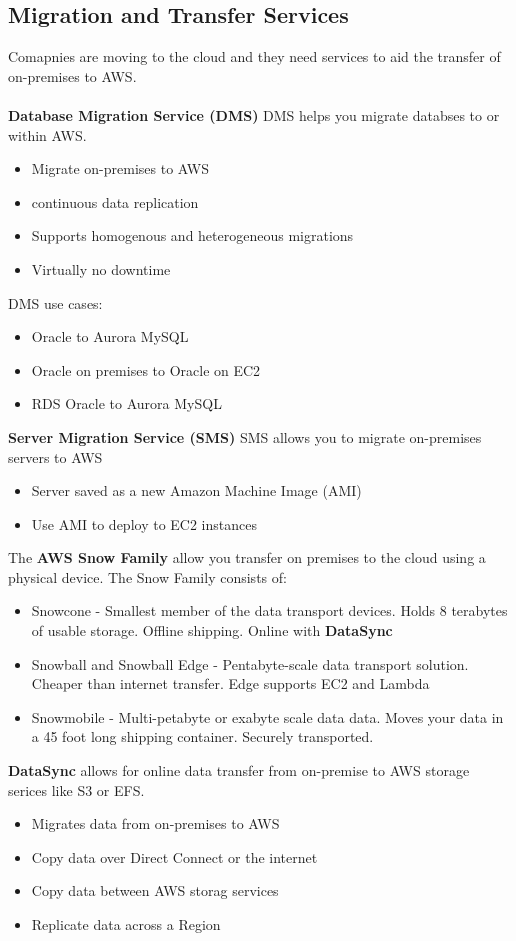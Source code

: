 \documentclass{article}%
\begin{document}
\subsection{Migration and Transfer Services}
Comapnies are moving to the cloud and they need services to aid the transfer of on-premises to AWS. \\ \\
\textbf{Database Migration Service (DMS)} DMS helps you migrate databses to or within AWS. 
\begin{itemize}
    \item Migrate on-premises to AWS
    \item continuous data replication
    \item Supports homogenous and heterogeneous migrations
    \item Virtually no downtime
\end{itemize}
DMS use cases:
\begin{itemize}
    \item Oracle to Aurora MySQL
    \item Oracle on premises to Oracle on EC2
    \item RDS Oracle to Aurora MySQL
\end{itemize}
\textbf{Server Migration Service (SMS)}
SMS allows you to migrate on-premises servers to AWS
\begin{itemize}
    \item Server saved as a new Amazon Machine Image (AMI)
    \item Use AMI to deploy to EC2 instances
\end{itemize}
The \textbf{AWS Snow Family} allow you transfer on premises to the cloud using a physical device. The Snow Family consists of:
\begin{itemize}
    \item Snowcone - Smallest member of the data transport devices. Holds 8 terabytes of usable storage. Offline shipping. Online with \textbf{DataSync}
    \item Snowball and Snowball Edge - Pentabyte-scale data transport solution. Cheaper than internet transfer. Edge supports EC2 and Lambda
    \item Snowmobile - Multi-petabyte or exabyte scale data data. Moves your data in a 45 foot long shipping container. Securely transported.
\end{itemize}
\textbf{DataSync} allows for online data transfer from on-premise to AWS storage serices like S3 or EFS.
\begin{itemize}
    \item Migrates data from on-premises to AWS
    \item Copy data over Direct Connect or the internet
    \item Copy data between AWS storag services
    \item Replicate data across a Region
\end{itemize}
\end{document}
